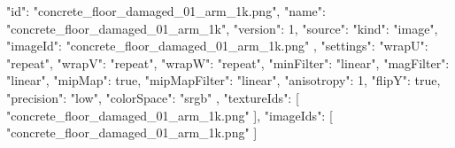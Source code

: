 {
  "id": "concrete_floor_damaged_01_arm_1k.png",
  "name": "concrete_floor_damaged_01_arm_1k",
  "version": 1,
  "source": {
    "kind": "image",
    "imageId": "concrete_floor_damaged_01_arm_1k.png"
  },
  "settings": {
    "wrapU": "repeat",
    "wrapV": "repeat",
    "wrapW": "repeat",
    "minFilter": "linear",
    "magFilter": "linear",
    "mipMap": true,
    "mipMapFilter": "linear",
    "anisotropy": 1,
    "flipY": true,
    "precision": "low",
    "colorSpace": "srgb"
  },
  "textureIds": [
    "concrete_floor_damaged_01_arm_1k.png"
  ],
  "imageIds": [
    "concrete_floor_damaged_01_arm_1k.png"
  ]
}
